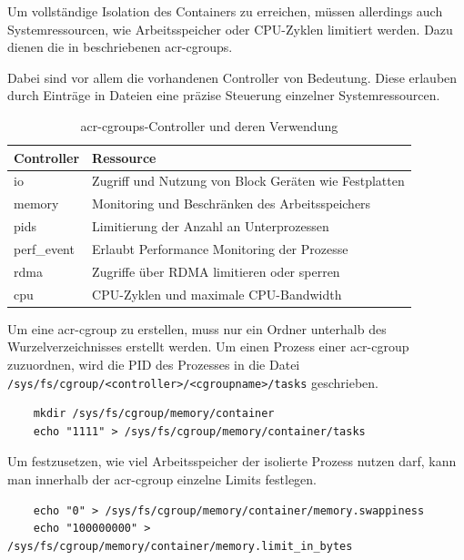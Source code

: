 Um vollständige Isolation des Containers zu erreichen, müssen allerdings auch Systemressourcen, wie Arbeitsspeicher oder CPU-Zyklen limitiert werden. Dazu dienen die in  beschriebenen \glspl{acr-cgroup}.

Dabei sind vor allem die vorhandenen Controller von Bedeutung. Diese erlauben durch Einträge in Dateien eine präzise Steuerung einzelner Systemressourcen.

\begin{table}[h]
	\begin{center}
		\begin{tabular}{ll}
			\toprule
			Controller 	& Ressource 												\\
			\midrule
			io			& Zugriff und Nutzung von Block Geräten wie Festplatten		\\
			memory		& Monitoring und Beschränken des Arbeitsspeichers 			\\
			pids		& Limitierung der Anzahl an Unterprozessen					\\
			perf\_event	& Erlaubt Performance Monitoring der Prozesse				\\
			rdma		& Zugriffe über RDMA limitieren oder sperren				\\
			cpu			& CPU-Zyklen und maximale CPU-Bandwidth						\\
			\bottomrule
		\end{tabular}
		\caption{\Glspl{acr-cgroup}-Controller und deren Verwendung \citep{Cgroups7LinuxManualPage}}
		\label{tab:cgroupController}
	\end{center}
\end{table}

Um eine \gls{acr-cgroup} zu erstellen, muss nur ein Ordner unterhalb des Wurzelverzeichnisses erstellt werden. Um einen Prozess einer \gls{acr-cgroup} zuzuordnen, wird die PID des Prozesses in die Datei \texttt{/sys/fs/cgroup/<controller>/<cgroupname>/tasks} geschrieben.

\begin{lstlisting}
	mkdir /sys/fs/cgroup/memory/container
	echo "1111" > /sys/fs/cgroup/memory/container/tasks
\end{lstlisting}

Um festzusetzen, wie viel Arbeitsspeicher der isolierte Prozess nutzen darf, kann man innerhalb der \gls{acr-cgroup} einzelne Limits festlegen.
\begin{lstlisting}
	echo "0" > /sys/fs/cgroup/memory/container/memory.swappiness
	echo "100000000" > /sys/fs/cgroup/memory/container/memory.limit_in_bytes
\end{lstlisting}

